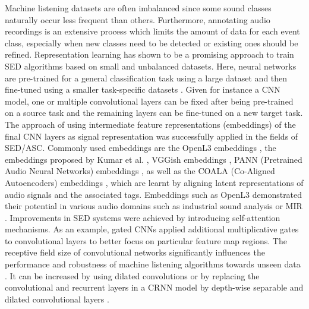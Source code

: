 \documentclass[11pt]{article}
\begin{document}
Machine listening datasets are often imbalanced since some sound classes naturally occur less frequent than others. Furthermore, annotating audio recordings is an extensive process which limits the amount of data for each event class, especially when new classes need to be detected or existing ones should be refined. 
Representation learning has shown to be a promising approach to train SED algorithms based on small and unbalanced datasets. Here, neural networks are pre-trained for a general classification task using a large dataset and then fine-tuned using a smaller task-specific datasets \cite{Arora2017}.
Given for instance a CNN model, one or multiple convolutional layers can be fixed after being pre-trained on a source task and the remaining layers can be fine-tuned on a new target task. The approach of using
intermediate feature representations (embeddings) of the final CNN layers as signal representation was successfully applied in the fields of SED/ASC. Commonly used embeddings are the OpenL3 embeddings \cite{Cramer2019:openl3},  the embeddings proposed by Kumar et al. \cite{Kumar2018:embedding}, VGGish embeddings \cite{Hershey:2017:CNN:ICASSP}, PANN (Pretrained Audio Neural Networks) embeddings \cite{Kong2019:PANN:ARXIV}, as well as the COALA (Co-Aligned Autoencoders) embeddings \cite{Favory:2020:COALA:ARXIV}, which are learnt by aligning latent representations of audio signals and the associated tags. Embeddings such as OpenL3 demonstrated their potential in various audio domains such as industrial sound analysis or MIR \cite{Grollmisch2020:embeddings}. %
Improvements in SED systems were achieved by introducing self-attention mechanisms. As an example, gated CNNs \cite{Xu:2018:WeaklyLabeledEventDetection:ICASSP} applied additional multiplicative gates to convolutional layers to better focus on particular feature map regions. 
The receptive field size of convolutional networks significantly influences the performance and robustness of machine listening algorithms towards unseen data \cite{Koutini:2019:ReceptiveField:DCASE}.
It can be increased by using dilated convolutions \cite{Li:2020:DilatedCRNN:ARXIV} or by replacing the convolutional and recurrent layers in a CRNN model by depth-wise separable and dilated convolutional layers \cite{Drossos:2020:SED:ARXIV}. %
\end{document}
